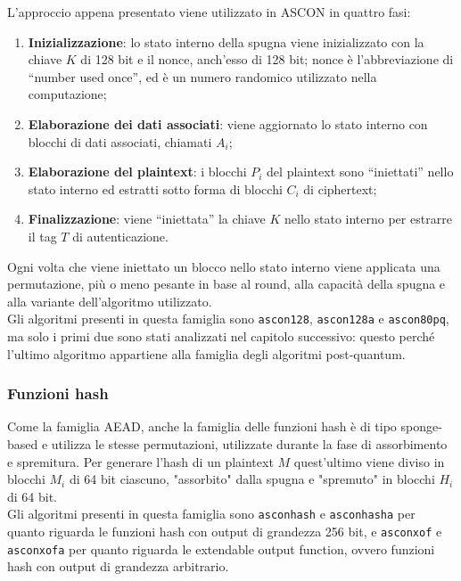 \noindent L'approccio appena presentato viene utilizzato in ASCON in quattro fasi\cite{ascon-specification}:
\begin{enumerate}
    \item \textbf{Inizializzazione}: lo stato interno della spugna viene inizializzato con la chiave $K$ di 128 bit e il nonce, anch'esso di 128 bit; nonce è l'abbreviazione di ``number used once'', ed è un numero randomico utilizzato nella computazione;
    \item \textbf{Elaborazione dei dati associati}: viene aggiornato lo stato interno con blocchi di dati associati, chiamati $A_i$;
    \item \textbf{Elaborazione del plaintext}: i blocchi $P_i$ del plaintext sono ``iniettati'' nello stato interno ed estratti sotto forma di blocchi $C_i$ di ciphertext;
    \item \textbf{Finalizzazione}: viene ``iniettata'' la chiave $K$ nello stato interno per estrarre il tag $T$ di autenticazione.
\end{enumerate}
Ogni volta che viene iniettato un blocco nello stato interno viene applicata una permutazione, più o meno pesante in base al round, alla capacità della spugna e alla variante dell'algoritmo utilizzato. \\

\noindent Gli algoritmi presenti in questa famiglia sono \texttt{ascon128}, \texttt{ascon128a} e \texttt{ascon80pq}, ma solo i primi due sono stati analizzati nel capitolo successivo: questo perché l'ultimo algoritmo appartiene alla famiglia degli algoritmi post-quantum.

\subsubsection{Funzioni hash}

Come la famiglia AEAD, anche la famiglia delle funzioni hash è di tipo sponge-based e utilizza le stesse permutazioni, utilizzate durante la fase di assorbimento e spremitura. Per generare l'hash di un plaintext $M$ quest'ultimo viene diviso in blocchi $M_i$ di 64 bit ciascuno, "assorbito" dalla spugna e "spremuto" in blocchi $H_i$ di 64 bit. \\

\noindent Gli algoritmi presenti in questa famiglia sono \texttt{asconhash} e \texttt{asconhasha} per quanto riguarda le funzioni hash con output di grandezza 256 bit, e \texttt{asconxof} e \texttt{asconxofa} per quanto riguarda le extendable output function, ovvero funzioni hash con output di grandezza arbitrario\cite{ascon-specification}.

